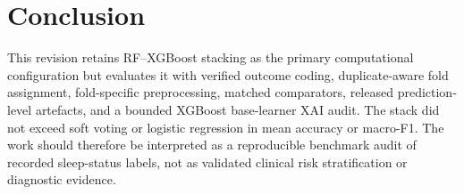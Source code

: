 \section{Conclusion}
\label{sec:conclusion-revision}

This revision retains RF--XGBoost stacking as the primary computational configuration but evaluates it with verified outcome coding, duplicate-aware fold assignment, fold-specific preprocessing, matched comparators, released prediction-level artefacts, and a bounded XGBoost base-learner XAI audit. The stack did not exceed soft voting or logistic regression in mean accuracy or macro-F1. The work should therefore be interpreted as a reproducible benchmark audit of recorded sleep-status labels, not as validated clinical risk stratification or diagnostic evidence.
